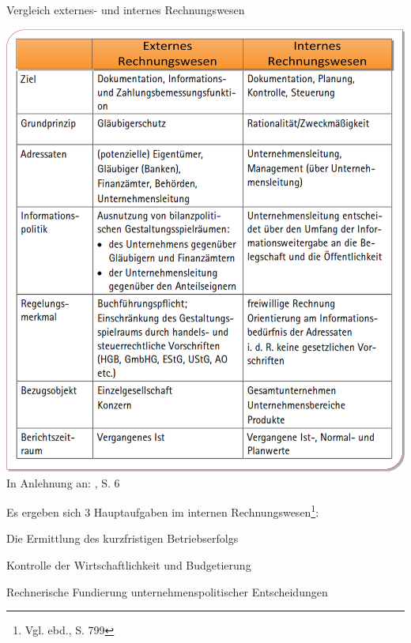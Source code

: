 \begin{table}[htbp]
\begin{center}
\caption[Vergleich externes- und internes Rechnungswesen]{Vergleich externes- und internes Rechnungswesen}
\includegraphics[width=1\textwidth]{Images/VergleichIntExt.png}
\label{abb1}
{\footnotesize In Anlehnung an: \cite{Lojewski2001}, S. 6}
\end{center}
\end{table} 
\noindent Es ergeben sich 3 Hauptaufgaben im internen Rechnungswesen\footnote{Vgl. ebd., S. 799}:
\begin{compactitem}
\item[1] Die Ermittlung des kurzfristigen Betriebserfolgs
\item[2] Kontrolle der Wirtschaftlichkeit und Budgetierung
\item[3] Rechnerische Fundierung unternehmenspolitischer Entscheidungen
\end{compactitem}

